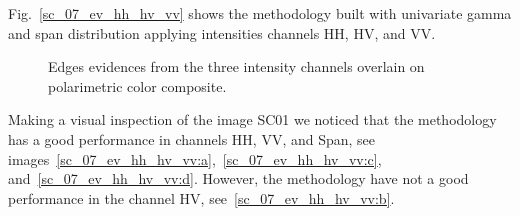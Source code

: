 \documentclass[remotesensing,article,submit,pdftex,moreauthors]{Definitions/mdpi}
\begin{document}
Fig.~\eqref{sc_07_ev_hh_hv_vv} shows the methodology built with univariate gamma and span distribution applying intensities channels HH, HV, and VV.
\begin{figure}[hbt]
	\centering
     \caption{Edges evidences from the three intensity channels overlain on polarimetric color composite.}
     \label{sc_07_ev_hh_hv_vv} 
   \end{figure}

Making a visual inspection of the image SC01 we noticed that the methodology has a good performance in channels HH, VV, and Span, see images~\eqref{sc_07_ev_hh_hv_vv:a},~\eqref{sc_07_ev_hh_hv_vv:c}, and~\eqref{sc_07_ev_hh_hv_vv:d}. However, the methodology have not a good performance in the channel HV, see~\eqref{sc_07_ev_hh_hv_vv:b}.  
\end{document}
